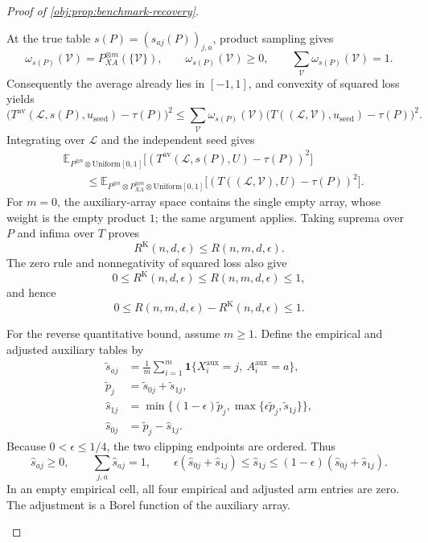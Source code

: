 \documentclass[11pt]{article}
\begin{document}
\begin{proof}[Proof of \cref{obj:prop:benchmark-recovery}]
\begin{enumerate}
At the true table \(s(P)=(s_{aj}(P))_{j,a}\), product sampling gives
\[
\omega_{s(P)}(\mathcal V)
=P_{XA}^{\otimes m}(\{\mathcal V\}),
\qquad
\omega_{s(P)}(\mathcal V)\ge0,
\qquad
\sum_{\mathcal V}\omega_{s(P)}(\mathcal V)=1.
\]
Consequently the average already lies in \([-1,1]\), and convexity of squared loss yields
\[
\bigl(T^{\mathrm{av}}(\mathcal L,s(P),u_{\mathrm{seed}})
-\tau(P)\bigr)^2
\le
\sum_{\mathcal V}\omega_{s(P)}(\mathcal V)
\bigl(T((\mathcal L,\mathcal V),u_{\mathrm{seed}})
-\tau(P)\bigr)^2.
\]
Integrating over \(\mathcal L\) and the independent seed gives
\[
\begin{aligned}
&\mathbb E_{P^{\otimes n}\otimes\mathrm{Uniform}[0,1]}
\bigl[(T^{\mathrm{av}}(\mathcal L,s(P),U)-\tau(P))^2\bigr]\\
&\qquad\le
\mathbb E_{P^{\otimes n}\otimes P_{XA}^{\otimes m}
\otimes\mathrm{Uniform}[0,1]}
\bigl[(T((\mathcal L,\mathcal V),U)-\tau(P))^2\bigr].
\end{aligned}
\]
For \(m=0\), the auxiliary-array space contains the single empty array, whose weight is the empty product \(1\); the same argument applies. Taking suprema over \(P\) and infima over \(T\) proves
\[
R^{\mathrm K}(n,d,\epsilon)\le R(n,m,d,\epsilon).
\]
The zero rule and nonnegativity of squared loss also give
\[
0\le R^{\mathrm K}(n,d,\epsilon)
\le R(n,m,d,\epsilon)\le1,
\]
and hence
\[
0\le R(n,m,d,\epsilon)-R^{\mathrm K}(n,d,\epsilon)\le1.
\]

For the reverse quantitative bound, assume \(m\ge1\). Define the empirical and adjusted auxiliary tables by
\[
\begin{aligned}
\widetilde s_{aj}
&=\frac1m\sum_{i=1}^m
\mathbf1\{X_i^{\mathrm{aux}}=j,\ A_i^{\mathrm{aux}}=a\},\\
\widetilde p_j&=\widetilde s_{0j}+\widetilde s_{1j},\\
\widehat s_{1j}
&=\min\{(1-\epsilon)\widetilde p_j,
          \max\{\epsilon\widetilde p_j,\widetilde s_{1j}\}\},\\
\widehat s_{0j}&=\widetilde p_j-\widehat s_{1j}.
\end{aligned}
\]
Because \(0<\epsilon\le1/4\), the two clipping endpoints are ordered. Thus
\[
\widehat s_{aj}\ge0,\qquad
\sum_{j,a}\widehat s_{aj}=1,\qquad
\epsilon(\widehat s_{0j}+\widehat s_{1j})
\le\widehat s_{1j}
\le(1-\epsilon)(\widehat s_{0j}+\widehat s_{1j}).
\]
In an empty empirical cell, all four empirical and adjusted arm entries are zero. The adjustment is a Borel function of the auxiliary array.


\end{enumerate}
\end{proof}
\end{document}
